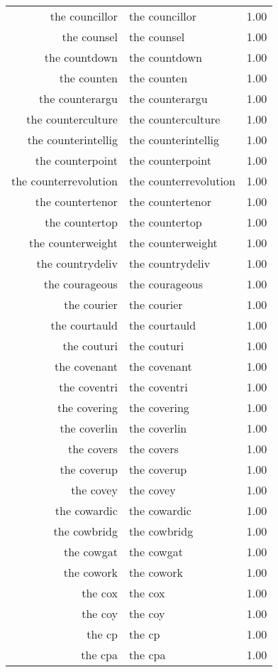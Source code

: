 \begin{table}[ht]
\begin{tabular}{rlr}
  the councillor & the councillor & 1.00 \\ 
  the counsel & the counsel & 1.00 \\ 
  the countdown & the countdown & 1.00 \\ 
  the counten & the counten & 1.00 \\ 
  the counterargu & the counterargu & 1.00 \\ 
  the counterculture & the counterculture & 1.00 \\ 
  the counterintellig & the counterintellig & 1.00 \\ 
  the counterpoint & the counterpoint & 1.00 \\ 
  the counterrevolution & the counterrevolution & 1.00 \\ 
  the countertenor & the countertenor & 1.00 \\ 
  the countertop & the countertop & 1.00 \\ 
  the counterweight & the counterweight & 1.00 \\ 
  the countrydeliv & the countrydeliv & 1.00 \\ 
  the courageous & the courageous & 1.00 \\ 
  the courier & the courier & 1.00 \\ 
  the courtauld & the courtauld & 1.00 \\ 
  the couturi & the couturi & 1.00 \\ 
  the covenant & the covenant & 1.00 \\ 
  the coventri & the coventri & 1.00 \\ 
  the covering & the covering & 1.00 \\ 
  the coverlin & the coverlin & 1.00 \\ 
  the covers & the covers & 1.00 \\ 
  the coverup & the coverup & 1.00 \\ 
  the covey & the covey & 1.00 \\ 
  the cowardic & the cowardic & 1.00 \\ 
  the cowbridg & the cowbridg & 1.00 \\ 
  the cowgat & the cowgat & 1.00 \\ 
  the cowork & the cowork & 1.00 \\ 
  the cox & the cox & 1.00 \\ 
  the coy & the coy & 1.00 \\ 
  the cp & the cp & 1.00 \\ 
  the cpa & the cpa & 1.00 \\ 

\end{tabular}
\end{table}
